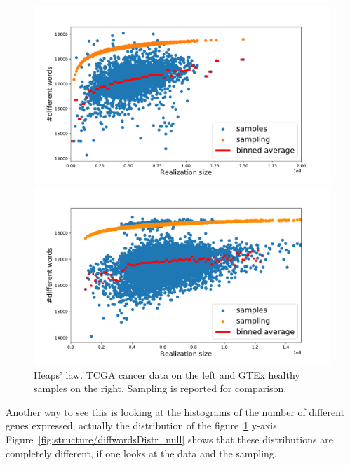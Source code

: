 \begin{figure}[htb!]
\begin{minipage}{0.5\textwidth}
    \centering
    \includegraphics[width=0.95\linewidth]{pictures/structure/tcga/heaps_null.pdf}
    \end{minipage}
\hspace{2mm}
\begin{minipage}{0.5\textwidth}
    \centering
    \includegraphics[width=0.95\linewidth]{pictures/structure/gtex/heaps_null.pdf}
    \end{minipage}
\caption{Heaps' law. TCGA cancer data on the left and GTEx healthy samples on the right. Sampling is reported for comparison.}
\label{fig:structure/heaps_null}
\end{figure}
\FloatBarrier
Another way to see this is looking at the histograms of the number of different genes expressed, actually the distribution of the figure~\ref{fig:structure/heaps_null} y-axis. Figure~\ref{fig:structure/diffwordsDistr_null} shows that these distributions are completely different, if one looks at the data and the sampling.
